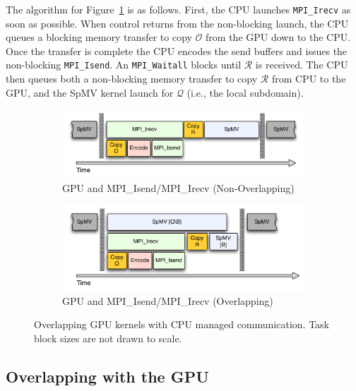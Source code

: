 The algorithm for Figure~\ref{fig:isendirecv_gpu} is as follows. First, the CPU launches \texttt{MPI\_Irecv} as soon as possible. When control returns from the non-blocking launch, the CPU queues a blocking memory transfer to copy $\mathcal{O}$ from the GPU down to the CPU. Once the transfer is complete the CPU encodes the send buffers and issues the non-blocking \texttt{MPI\_Isend}. An \texttt{MPI\_Waitall} blocks until $\mathcal{R}$ is received. The CPU then queues both a non-blocking memory transfer to copy $\mathcal{R}$ from CPU to the GPU, and the SpMV kernel launch for $\mathcal{Q}$ (i.e., the local subdomain). 


\begin{figure} 
\centering
\begin{subfigure}{0.48\textwidth}
\centering
\includegraphics[width=\textwidth]{../figures/omnigraffle/GPU_IsendIrecv.pdf}
\caption{GPU and MPI\_Isend/MPI\_Irecv (Non-Overlapping)}
\label{fig:isendirecv_gpu}
\end{subfigure}
\quad
\begin{subfigure}{0.48\textwidth}
\centering
\includegraphics[width=\textwidth]{../figures/omnigraffle/GPU_OverlapGPU.pdf}
\caption{GPU and MPI\_Isend/MPI\_Irecv (Overlapping)}
\label{fig:overlap_gpu}
\end{subfigure}
\caption{Overlapping GPU kernels with CPU managed communication. Task block sizes are not drawn to scale.} 
\label{fig:gpu_mpi_tuning}
\end{figure}

\subsection{Overlapping with the GPU}


